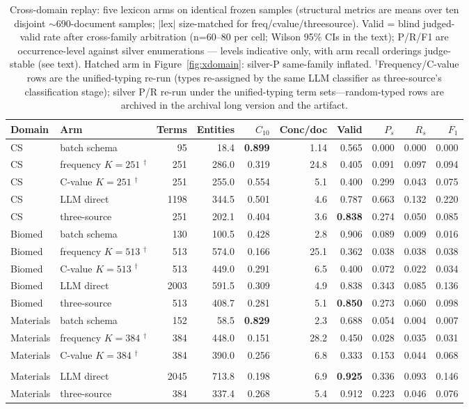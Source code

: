 \documentclass[sigconf,nonacm,anonymous]{acmart}
\begin{document}
\begin{table}[t]
\centering
\caption{Cross-domain replay: five lexicon arms on identical frozen
samples (structural metrics are means over ten disjoint
${\sim}$690-document samples; $|$lex$|$ size-matched for
freq/cvalue/threesource). Valid = blind judged-valid rate after
cross-family arbitration (n=60--80 per cell; Wilson 95\% CIs in the
text); P/R/F1 are occurrence-level
against silver enumerations --- levels indicative only, with arm
recall orderings judge-stable (see text).
Hatched arm in Figure~\ref{fig:xdomain}: silver-P same-family
inflated. $^{\dagger}$Frequency/C-value rows are the unified-typing
re-run (types re-assigned by the same LLM classifier as three-source's
classification stage); silver P/R re-run under the unified-typing term
sets---random-typed rows are archived in the archival long version and
the artifact.}
\label{tab:xdomain}
\small
\begin{tabular}{@{}llrrrrrrrr@{}}
\toprule
Domain & Arm & Terms & Entities & $C_{10}$ & Conc/doc & Valid & $P_{s}$ & $R_{s}$ & $F_1$ \\
\midrule
CS & batch schema & 95 & 18.4 & \textbf{0.899} & 1.14 & 0.565 & 0.000 & 0.000 & 0.000 \\
CS & frequency $K{=}251$ $^{\dagger}$ & 251 & 286.0 & 0.319 & 24.8 & 0.405 & 0.091 & 0.097 & 0.094 \\
CS & C-value $K{=}251$ $^{\dagger}$ & 251 & 255.0 & 0.554 & 5.1 & 0.400 & 0.299 & 0.043 & 0.075 \\
CS & LLM direct & 1198 & 344.5 & 0.501 & 4.6 & 0.787 & 0.663 & 0.132 & 0.220 \\
CS & three-source & 251 & 202.1 & 0.404 & 3.6 & \textbf{0.838} & 0.274 & 0.050 & 0.085 \\
\midrule
Biomed & batch schema & 130 & 100.5 & 0.428 & 2.8 & 0.906 & 0.089 & 0.009 & 0.016 \\
Biomed & frequency $K{=}513$ $^{\dagger}$ & 513 & 574.0 & 0.166 & 25.1 & 0.362 & 0.038 & 0.038 & 0.038 \\
Biomed & C-value $K{=}513$ $^{\dagger}$ & 513 & 449.0 & 0.291 & 6.5 & 0.400 & 0.072 & 0.022 & 0.034 \\
Biomed & LLM direct & 2003 & 591.5 & 0.309 & 4.9 & 0.838 & 0.343 & 0.085 & 0.136 \\
Biomed & three-source & 513 & 408.7 & 0.281 & 5.1 & \textbf{0.850} & 0.273 & 0.060 & 0.098 \\
\midrule
Materials & batch schema & 152 & 58.5 & \textbf{0.829} & 2.3 & 0.688 & 0.054 & 0.004 & 0.007 \\
Materials & frequency $K{=}384$ $^{\dagger}$ & 384 & 448.0 & 0.151 & 28.2 & 0.450 & 0.028 & 0.035 & 0.031 \\
Materials & C-value $K{=}384$ $^{\dagger}$ & 384 & 390.0 & 0.256 & 6.8 & 0.333 & 0.153 & 0.044 & 0.068 \\\\
Materials & LLM direct & 2045 & 713.8 & 0.198 & 6.9 & \textbf{0.925} & 0.336 & 0.093 & 0.146 \\
Materials & three-source & 384 & 337.4 & 0.268 & 5.4 & 0.912 & 0.223 & 0.046 & 0.076 \\
\bottomrule
\end{tabular}
\end{table}
\end{document}
